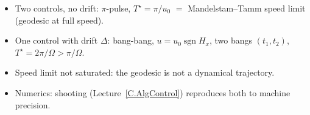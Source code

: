 \documentclass[handoutsbeamer.tex]{subfiles}
\begin{document}
\begin{frame}
{\begin{itemize}
    \item Two controls, no drift: $\pi$-pulse, $T^\star=\pi/u_0$ $=$ Mandelstam--Tamm speed limit (geodesic at full speed).
    \item One control with drift $\Delta$: bang-bang, $u=u_0\operatorname{sgn}H_x$, two bangs $(t_1,t_2)$, $T^\star=2\pi/\Omega>\pi/\Omega$.
    \item Speed limit not saturated: the geodesic is not a dynamical trajectory.
    \item Numerics: shooting (Lecture~\ref{C.AlgControl}) reproduces both to machine precision.
\end{itemize}
\begin{center}\resizebox{!}{0.42\textheight}{}\end{center}}
\end{frame}
\end{document}
